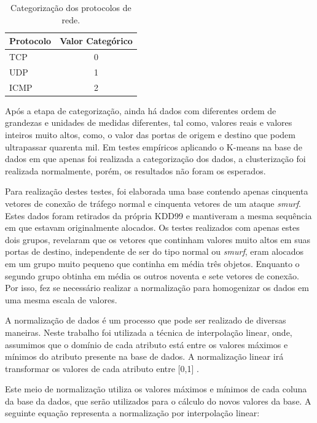 \begin{table}[h]
\centering
\caption{Categorização dos protocolos de rede.}
\vspace{0.5cm}
\begin{tabular}{|l|c|}
\hline
\textbf{Protocolo} & \textbf{Valor Categórico}\\
\hline
TCP & 0\\
\hline
UDP & 1\\
\hline
ICMP & 2\\
\hline
\end{tabular}
\end{table}

\indent Após a etapa de categorização, ainda há dados com diferentes ordem de grandezas e unidades de medidas diferentes, tal como, valores reais e valores inteiros muito altos, como, o valor das portas de origem e destino que podem ultrapassar quarenta mil. Em testes empíricos aplicando o K-means na base de dados em que apenas foi realizada a categorização dos dados, a clusterização foi realizada normalmente, porém, os resultados não foram os esperados.

\indent Para realização destes testes, foi elaborada uma base contendo apenas cinquenta vetores de conexão de tráfego normal e cinquenta vetores de um ataque \textit{smurf}. Estes dados foram retirados da própria KDD99 e mantiveram a mesma sequência em que estavam originalmente alocados. Os testes realizados com apenas estes dois grupos, revelaram que os vetores que continham valores muito altos em suas portas de destino, independente de ser do tipo normal ou \textit{smurf}, eram alocados em um grupo muito pequeno que continha em média três objetos. Enquanto o segundo grupo obtinha em média os outros noventa e sete vetores de conexão. Por isso, fez se necessário realizar a normalização para homogenizar os dados em uma mesma escala de valores.

\indent A normalização de dados é um processo que pode ser realizado de diversas maneiras. Neste trabalho foi utilizada a técnica de interpolação linear, onde, assumimos que o domínio de cada atributo está entre os valores máximos e mínimos do atributo presente na base de dados. A normalização linear irá transformar os valores de cada atributo entre [0,1] \cite{goldschmidt2005} \cite{Silva2007}.

\indent Este meio de normalização utiliza os valores máximos e mínimos de cada coluna da base da dados, que serão utilizados para o cálculo do novos valores da base. A seguinte equação representa a normalização por interpolação linear:


